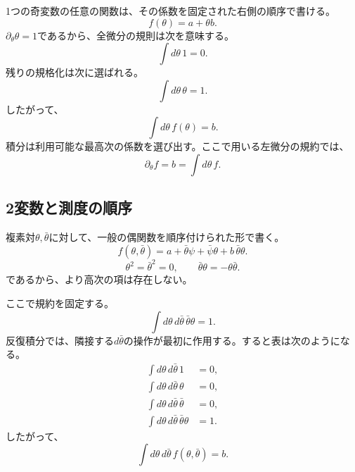 1つの奇変数の任意の関数は、その係数を固定された右側の順序で書ける。
\begin{equation}
f(\theta)=a+\theta b.
\end{equation}
\(\partial_\theta\theta=1\)であるから、全微分の規則は次を意味する。
\begin{equation}
\int d\theta\,1=0.
\end{equation}
残りの規格化は次に選ばれる。
\begin{equation}
\int d\theta\,\theta=1.
\end{equation}
したがって、
\begin{equation}
\int d\theta\,f(\theta)=b.
\end{equation}
積分は利用可能な最高次の係数を選び出す。ここで用いる左微分の規約では、
\begin{equation}
\partial_\theta f=b
=\int d\theta\,f.
\end{equation}

\begin{classroomqa}
\end{classroomqa}

\subsection{2変数と測度の順序}

複素対\(\theta,\bar\theta\)に対して、一般の偶関数を順序付けられた形で書く。
\begin{equation}
f(\theta,\bar\theta)
=a+\bar\theta\psi+\bar\psi\theta+b\,\bar\theta\theta.
\end{equation}
\begin{equation}
\theta^2=\bar\theta^2=0,
\qquad
\bar\theta\theta=-\theta\bar\theta.
\end{equation}であるから、より高次の項は存在しない。

ここで規約を固定する。
\begin{equation}
\int d\theta\,d\bar\theta\,
\bar\theta\theta=1.
\end{equation}
反復積分では、隣接する\(d\bar\theta\)の操作が最初に作用する。すると表は次のようになる。
\begin{align}
\int d\theta\,d\bar\theta\,1&=0,\\
\int d\theta\,d\bar\theta\,\theta&=0,\\
\int d\theta\,d\bar\theta\,\bar\theta&=0,\\
\int d\theta\,d\bar\theta\,\bar\theta\theta&=1.
\end{align}
したがって、
\begin{equation}
\int d\theta\,d\bar\theta\,
f(\theta,\bar\theta)=b.
\end{equation}

